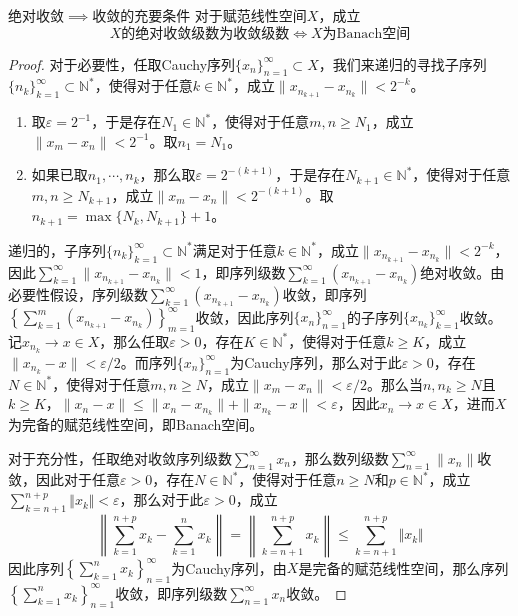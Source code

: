 \documentclass[lang = cn, scheme = chinese, thmcnt = section]{elegantbook}
\newcommand{\sub}{\subset}             %
\begin{document}
\begin{theorem}{绝对收敛$\implies$收敛的充要条件}
	对于赋范线性空间$X$，成立
	$$
	X\text{的绝对收敛级数为收敛级数}\iff X\text{为Banach空间}
	$$
\end{theorem}

\begin{proof}
	对于必要性，任取Cauchy序列$\{x_n\}_{n=1}^{\infty}\sub X$，我们来递归的寻找子序列$\{ n_k \}_{k=1}^{\infty}\sub\mathbb{N}^*$，使得对于任意$k\in\mathbb{N}^*$，成立$\| x_{n_{k+1}}-x_{n_k} \|<2^{-k}$。
	
	\begin{enumerate}
		\item 取$\varepsilon=2^{-1}$，于是存在$N_1\in\mathbb{N}^*$，使得对于任意$m,n\ge N_1$，成立$\|x_m-x_n\|<2^{-1}$。取$n_1=N_1$。
		\item 如果已取$n_1,\cdots,n_k$，那么取$\varepsilon=2^{-(k+1)}$，于是存在$N_{k+1}\in\mathbb{N}^*$，使得对于任意$m,n\ge N_{k+1}$，成立$\|x_m-x_n\|<2^{-(k+1)}$。取$n_{k+1}=\max\{ N_{k},N_{k+1} \}+1$。
	\end{enumerate}
	
	递归的，子序列$\{ n_k \}_{k=1}^{\infty}\sub\mathbb{N}^*$满足对于任意$k\in\mathbb{N}^*$，成立$\| x_{n_{k+1}}-x_{n_k} \|<2^{-k}$，因此$\displaystyle\sum_{k=1}^{\infty}\|x_{n_{k+1}}-x_{n_k}\|<1$，即序列级数$\displaystyle\sum_{k=1}^{\infty}(x_{n_{k+1}}-x_{n_k})$绝对收敛。由必要性假设，序列级数$\displaystyle\sum_{k=1}^{\infty}(x_{n_{k+1}}-x_{n_k})$收敛，即序列$\displaystyle\left\{\sum_{k=1}^{m}(x_{n_{k+1}}-x_{n_k})\right\}_{m=1}^{\infty}$收敛，因此序列$\{x_n\}_{n=1}^{\infty}$的子序列$\{ x_{n_k} \}_{k=1}^{\infty}$收敛。记$x_{n_k}\to x\in X$，那么任取$\varepsilon>0$，存在$K\in\mathbb{N}^*$，使得对于任意$k\ge K$，成立$\| x_{n_k}-x\|<\varepsilon/2$。而序列$\{x_n\}_{n=1}^{\infty}$为Cauchy序列，那么对于此$\varepsilon>0$，存在$N\in\mathbb{N}^*$，使得对于任意$m,n\ge N$，成立$\|x_m-x_n\|<\varepsilon/2$。那么当$n,n_k\ge N$且$k\ge K$，$\| x_n-x \|\le \|x_n-x_{n_k}\|+\|x_{n_k}-x\|<\varepsilon$，因此$x_n\to x\in X$，进而$X$为完备的赋范线性空间，即Banach空间。
	
	对于充分性，任取绝对收敛序列级数$\displaystyle\sum_{n=1}^{\infty}x_n$，那么数列级数$\displaystyle\sum_{n=1}^{\infty}\|x_n\|$收敛，因此对于任意$\varepsilon>0$，存在$N\in\mathbb{N}^*$，使得对于任意$n\ge N$和$p\in\mathbb{N}^*$，成立$\displaystyle\sum_{k=n+1}^{n+p} \Vert x_k \Vert<\varepsilon$，那么对于此$\varepsilon>0$，成立
	$$
	\left\|\sum_{k=1}^{n+p}x_k-\sum_{k=1}^{n}x_k\right\|
	=\left\|\sum_{k=n+1}^{n+p}x_k\right\|
	\le\sum_{k=n+1}^{n+p} \Vert x_k \Vert
	$$
	因此序列$\displaystyle\left\{\sum_{k=1}^{n}x_k\right\}_{n=1}^{\infty}$为Cauchy序列，由$X$是完备的赋范线性空间，那么序列$\displaystyle\left\{\sum_{k=1}^{n}x_k\right\}_{n=1}^{\infty}$收敛，即序列级数$\displaystyle\sum_{n=1}^{\infty}x_n$收敛。
\end{proof}
\end{document}
